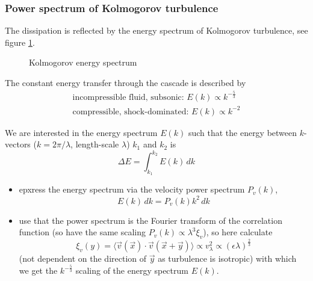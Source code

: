 \subsubsection{Power spectrum of Kolmogorov turbulence}
The dissipation is reflected by the energy spectrum of Kolmogorov turbulence, see figure \ref{fig:kolmogorov_spectrum}.

\begin{figure}[!htb]
    \centering
    
    \caption{Kolmogorov energy spectrum}
    \label{fig:kolmogorov_spectrum}
\end{figure}

The constant energy transfer through the cascade is described by
\begin{equation}
    \begin{gathered}
        \text{incompressible fluid, subsonic: } E(k) \propto k^{-\frac{5}{3}} \\
        \text{compressible, shock-dominated: } E(k) \propto k^{-2}
    \end{gathered}
\end{equation}


We are interested in the energy spectrum $E(k)$ such that the energy between
$k$-vectors ($k = 2\pi \slash \lambda$, length-scale $\lambda$) $k_1$ and $k_2$ is
\begin{equation}
    \Delta E = \int_{k_1}^{k_2} E(k) \, dk
\end{equation}
\begin{itemize}
    \item epxress the energy spectrum via the velocity power spectrum $P_v(k)$, 
    \begin{equation}
        E(k) \, dk = P_v(k) k^2 \, dk
    \end{equation}
    \item use that the power spectrum is the Fourier transform of the correlation function (so have the same scaling $P_v(k) \propto \lambda^3 \xi_v$), so here
    calculate
    \begin{equation}
        \xi_v(y) = \langle \vec{v}(\vec{x}) \cdot \vec{v}(\vec{x}+\vec{y}) \rangle \propto v_\lambda^2 \propto (\epsilon \lambda)^{\frac{2}{3}}
    \end{equation}
    (not dependent on the direction of $\vec{y}$ as turbulence is isotropic) with which we get the $k^{-\frac{5}{3}}$ scaling of the energy spectrum $E(k)$.
\end{itemize}

\pagebreak